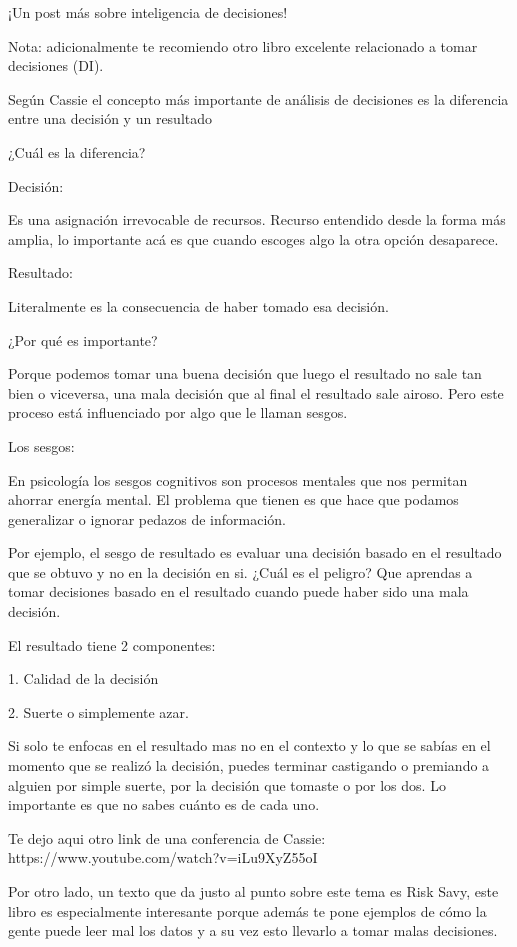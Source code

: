 ¡Un post más sobre inteligencia de decisiones!


Nota: adicionalmente te recomiendo otro libro excelente relacionado a tomar decisiones (DI).


Según Cassie el concepto más importante de análisis de decisiones es la diferencia entre una decisión y un resultado


¿Cuál es la diferencia?


Decisión:


Es una asignación irrevocable de recursos. Recurso entendido desde la forma más amplia, lo importante acá es que cuando escoges algo la otra opción desaparece. 


Resultado: 


Literalmente es la consecuencia de haber tomado esa decisión.


¿Por qué es importante? 


Porque podemos tomar una buena decisión que luego el resultado no sale tan bien o viceversa, una mala decisión que al final el resultado sale airoso. Pero este proceso está influenciado por algo que le llaman sesgos. 


Los sesgos:


En psicología los sesgos cognitivos son procesos mentales que nos permitan ahorrar energía mental. El problema que tienen es que hace que podamos generalizar o ignorar pedazos de información. 


Por ejemplo, el sesgo de resultado es evaluar una decisión basado en el resultado que se obtuvo y no en la decisión en si. ¿Cuál es el peligro? Que aprendas a tomar decisiones basado en el resultado cuando puede haber sido una mala decisión. 


El resultado tiene 2 componentes:


1. Calidad de la decisión 

2. Suerte o simplemente azar. 


Si solo te enfocas en el resultado mas no en el contexto y lo que se sabías en el momento que se realizó la decisión, puedes terminar castigando o premiando a alguien por simple suerte, por la decisión que tomaste o por los dos. Lo importante es que no sabes cuánto es de cada uno. 


Te dejo aqui otro link de una conferencia de Cassie: https://www.youtube.com/watch?v=iLu9XyZ55oI


Por otro lado, un texto que da justo al punto sobre este tema es Risk Savy, este libro es especialmente interesante porque además te pone ejemplos de cómo la gente puede leer mal los datos y a su vez esto llevarlo a tomar malas decisiones. 








